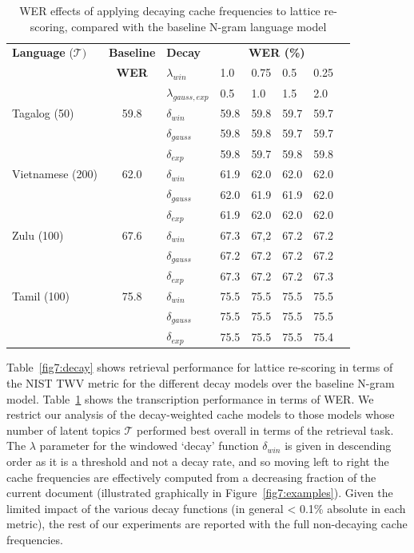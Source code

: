 

\begin{table}
\centering
   \begin{tabular}{lcllllll} \toprule
   \textbf{Language} ($\mathcal{T})$ & \textbf{Baseline}  & \textbf{Decay} & \multicolumn{4}{c}{\textbf{WER (\%)}}  \\ %
   & \textbf{WER} & $\lambda_{win}$ & 1.0 & 0.75 & 0.5 & 0.25 \\
   & & $\lambda_{gauss,exp}$ & 0.5 & 1.0 & 1.5 & 2.0 \\ \midrule
Tagalog (50) & 59.8 & $\delta_{win}$ & 59.8 & 59.8 & 59.7 & 59.7\\
  && $\delta_{gauss}$ & 59.8 & 59.8 & 59.7 & 59.7 \\
  && $\delta_{exp}$ & 59.8 & 59.7 & 59.8 & 59.8 \\
Vietnamese (200) & 62.0 & $\delta_{win}$ & 61.9 & 62.0 & 62.0 & 62.0  \\
&& $\delta_{gauss}$ & 62.0 & 61.9 & 61.9 & 62.0 \\
&& $\delta_{exp}$ & 61.9 & 62.0 & 62.0 & 62.0 \\
Zulu (100) & 67.6 & $\delta_{win}$ & 67.3 & 67,2 & 67.2  & 67.2 \\
&& $\delta_{gauss}$ & 67.2 & 67.2 & 67.2 & 67.2 \\
&& $\delta_{exp}$ & 67.3 & 67.2 & 67.2 & 67.3 \\
Tamil (100) & 75.8 & $\delta_{win}$ & 75.5 &  75.5 &  75.5 & 75.5 \\
&& $\delta_{gauss}$ & 75.5 & 75.5 & 75.5 & 75.5 \\
&& $\delta_{exp}$ & 75.5 & 75.5 & 75.5 & 75.4 \\ \bottomrule
\end{tabular}
\caption[WER effects of decaying cache frequencies]{WER effects of applying decaying cache frequencies to lattice re-scoring, compared with the baseline N-gram language model \label{fig7:decayWER}}
\end{table}

Table~\ref{fig7:decay} shows retrieval performance for lattice re-scoring in terms of the NIST TWV metric for the different decay models over the baseline N-gram model.   Table~\ref{fig7:decayWER} shows the transcription performance in terms of WER.   We restrict  our analysis of the decay-weighted cache models to those models whose number of latent topics $\mathcal{T}$ performed best overall in terms of the retrieval task.  The $\lambda$ parameter for the windowed `decay' function $\delta_{win}$ is given in descending order as it is a threshold and not a decay rate, and so moving left to right the cache frequencies are effectively computed from a decreasing fraction of the current document (illustrated graphically in  Figure~\ref{fig7:examples}).  Given the limited impact of the various decay functions (in general < 0.1\% absolute in each metric), the rest of our experiments are reported with the full non-decaying cache frequencies.


